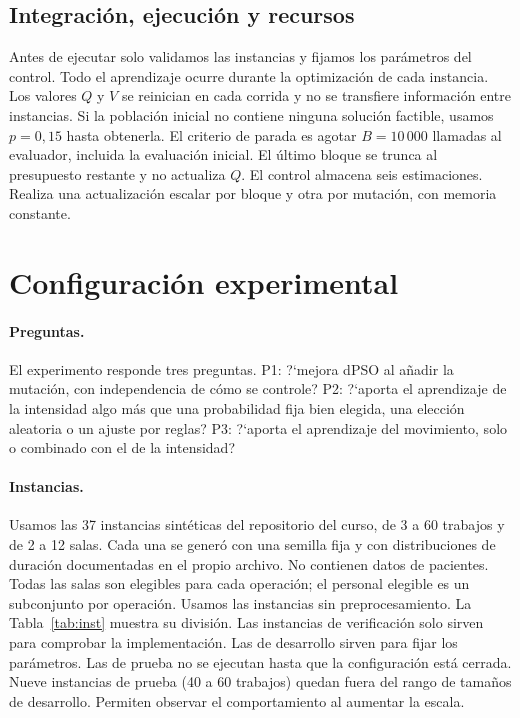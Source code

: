 \documentclass[10pt,a4paper]{article}
\newcommand{\dc}{{,}}%
\begin{document}
\subsection{Integración, ejecución y recursos}

Antes de ejecutar solo validamos las instancias y fijamos los parámetros del control. Todo el
aprendizaje ocurre durante la optimización de cada instancia. Los valores $Q$ y $V$ se
reinician en cada corrida y no se transfiere información entre instancias. Si la población
inicial no contiene ninguna solución factible, usamos $p=0\dc15$ hasta obtenerla. El criterio
de parada es agotar $B=10\,000$ llamadas al evaluador, incluida la evaluación inicial. El último
bloque se trunca al presupuesto restante y no actualiza $Q$. El control almacena seis
estimaciones. Realiza una actualización escalar por bloque y otra por mutación, con memoria
constante.

\section{Configuración experimental}
\label{sec:exp}

\paragraph{Preguntas.}
El experimento responde tres preguntas. P1: ?`mejora dPSO al añadir la mutación, con
independencia de cómo se controle? P2: ?`aporta el aprendizaje de la intensidad algo más que
una probabilidad fija bien elegida, una elección aleatoria o un ajuste por reglas? P3: ?`aporta
el aprendizaje del movimiento, solo o combinado con el de la intensidad?

\paragraph{Instancias.}
Usamos las 37 instancias sintéticas del repositorio del curso, de 3 a 60 trabajos y de 2 a 12
salas. Cada una se generó con una semilla fija y con distribuciones de duración documentadas en
el propio archivo. No contienen datos de pacientes. Todas las salas son elegibles para cada
operación; el personal elegible es un subconjunto por operación. Usamos las instancias sin
preprocesamiento. La Tabla~\ref{tab:inst} muestra su división. Las instancias de verificación
solo sirven para comprobar la implementación. Las de desarrollo sirven para fijar los
parámetros. Las de prueba no se ejecutan hasta que la configuración está cerrada. Nueve
instancias de prueba (40 a 60 trabajos) quedan fuera del rango de tamaños de desarrollo.
Permiten observar el comportamiento al aumentar la escala.
\end{document}

